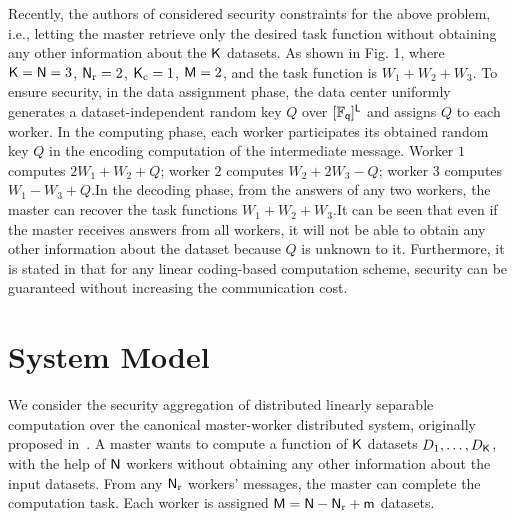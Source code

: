 \documentclass[conference,letterpaper]{IEEEtran}
\begin{document}
Recently, the authors of \cite{wan2022secure} considered security constraints for the above problem, i.e., letting the master retrieve only the desired task function without obtaining any other information about the ${\sf K}$ datasets. As shown in Fig. 1, where  ${\sf K}={\sf N}=3$, ${\sf N}_{\rm r}=2$, ${\sf K}_{\rm c}=1$, ${\sf M}=2$, and the task function is $W_1+W_2+W_3$. To ensure security, in the data assignment phase, the data center uniformly generates a dataset-independent random key $Q $ over $[\mathbb{F}_{{\sf q}}]^{{\sf L}}$ and assigns $Q $ to each worker. In the computing phase, each worker participates its obtained random key $Q $ in the encoding computation of the intermediate message. Worker $1$ computes $2W_1 + W_2 + Q$;   worker $2$ computes $W_2 + 2W_3 - Q$;   worker $3$ computes $W_1 - W_3 + Q$.In the decoding phase, from the answers of any two workers, the master can recover the task functions $W_1+W_2+W_3$.It can be seen that even if the master receives answers from all workers, it will not be able to obtain any other information about the dataset because $Q $ is unknown to it. Furthermore, it is stated in \cite{wan2022secure} that for any linear coding-based computation scheme, security can be guaranteed without increasing the communication cost.

\fi

\section{System Model}
\label{sec:system}

We consider the security aggregation of distributed linearly separable computation over the canonical master-worker distributed system, originally proposed in~\cite{wan2022secure}. 
A master wants to compute a function of ${\sf K}$  datasets $D_1, \ldots, D_{{\sf K}}$, with the help of ${\sf N}$ workers without obtaining any other information about the input datasets. From any ${\sf N}_{\rm r}$ workers' messages, the master can complete the computation task. Each worker is assigned ${\sf M} = {\sf N} - {\sf N}_{\rm r} + {\sf m}$ datasets. 
\end{document}
